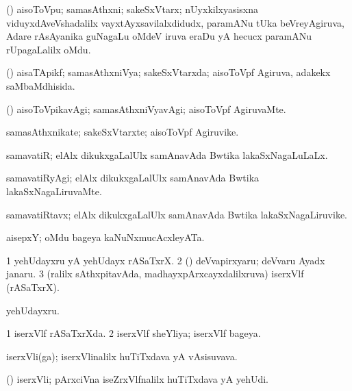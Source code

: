 \bentry
{}
\gl{\nA}
\bmng
(\ravi) aisoToVpu; samasAthxni; sakeSxVtarx; nUyxkilxyasisxna viduyxdAveVshadalilx vayxtAyxsavilalxdidudx, paramANu tUka beVreyAgiruva, Adare rAsAyanika guNagaLu oMdeV iruva eraDu yA hecucx paramANu rUpagaLalilx oMdu. 
\emng
\eentry

\bentry
{}
\gl{\gu}
\bmng
(\ravi) aisaTApikf; samasAthxniVya; sakeSxVtarxda; aisoToVpf Agiruva, adakekx saMbaMdhisida. 
\emng
\eentry

\bentry
{}
\gl{\kirxvi}
\bmng
(\ravi) aisoToVpikavAgi; samasAthxniVyavAgi; aisoToVpf AgiruvaMte. 
\emng
\eentry

\bentry
{}
\gl{\nA}
\bmng
samasAthxnikate; sakeSxVtarxte; aisoToVpf Agiruvike. 
\emng
\eentry

\bentry
{}
\gl{\gu}
\bmng
samavatiR; elAlx dikukxgaLalUlx samAnavAda Bwtika lakaSxNagaLuLaLx. 
\emng
\eentry

\bentry
{}
\gl{\kirxvi}
\bmng
samavatiRyAgi; elAlx dikukxgaLalUlx samAnavAda Bwtika lakaSxNagaLiruvaMte. 
\emng
\eentry

\bentry
{}
\gl{\nA}
\bmng
samavatiRtavx; elAlx dikukxgaLalUlx samAnavAda Bwtika lakaSxNagaLiruvike. 
\emng
\eentry

\bentry
{}
\gl{\nA}
\bmng
 aisepxY; oMdu bageya kaNuNxmucAcxleyATa. 
\emng
\eentry

\bentry
{}
\gl{\nA}
\bmng
\bnum
\num{1} yehUdayxru yA yehUdayx rASaTxrX. 
\num{2} (\rUpa) deVvapirxyaru; deVvaru Ayadx janaru. 
\num{3} (ralilx sAthxpitavAda, madhayxpArxcayxdalilxruva) iserxVlf (rASaTxrX). 
\enum
\emng

\noindent
\gl{\pagu}
\bmng
{} yehUdayxru. 
\emng
\eentry

\bentry
{}
\gl{\gu}
\bmng
\bnum
\num{1} iserxVlf rASaTxrXda. 
\num{2} iserxVlf sheYliya; iserxVlf bageya. 
\enum
\emng
\eentry

\bentry
{}
\gl{\nA}
\bmng
iserxVli(ga); iserxVlinalilx huTiTxdava yA vAsisuvava. 
\emng
\eentry

\bentry
{}
\gl{\nA}
\bmng
(\ca) iserxVli; pArxciVna iseZrxVlfnalilx huTiTxdava yA yehUdi. 
\emng
\eentry

